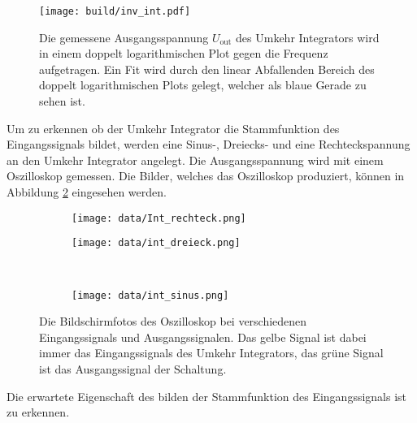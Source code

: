 \begin{figure}
    \centering
    \texttt{[image: build/inv\_int.pdf]}
    \caption{Die gemessene Ausgangsspannung $U_\text{out}$ des Umkehr Integrators wird in einem doppelt logarithmischen Plot gegen die Frequenz aufgetragen.
    Ein Fit wird durch den linear Abfallenden Bereich des doppelt logarithmischen Plots gelegt, welcher als blaue Gerade zu sehen ist.}
    \label{fig:inv_int}
\end{figure}

Um zu erkennen ob der Umkehr Integrator die Stammfunktion des Eingangssignals bildet, werden eine Sinus-, Dreiecks- und eine Rechteckspannung an den Umkehr Integrator angelegt.
Die Ausgangsspannung wird mit einem Oszilloskop gemessen.
Die Bilder, welches das Oszilloskop produziert, können in Abbildung \ref{fig:umkehr_oszi} eingesehen werden.
\begin{figure}
    \centering
    \begin{subfigure}{0.49\linewidth}%
        \texttt{[image: data/Int\_rechteck.png]}
    \end{subfigure}
    \hfill
    \begin{subfigure}{0.49\linewidth}%
        \texttt{[image: data/int\_dreieck.png]}
    \end{subfigure}\\
    \begin{subfigure}{0.49\linewidth}%
        \texttt{[image: data/int\_sinus.png]}
    \end{subfigure}
    \caption{Die Bildschirmfotos des Oszilloskop bei verschiedenen Eingangssignals und Ausgangssignalen.
    Das gelbe Signal ist dabei immer das Eingangssignals des Umkehr Integrators, das grüne Signal ist das Ausgangssignal der Schaltung.}
    \label{fig:umkehr_oszi}
\end{figure}
Die erwartete Eigenschaft des bilden der Stammfunktion des Eingangssignals ist zu erkennen.

